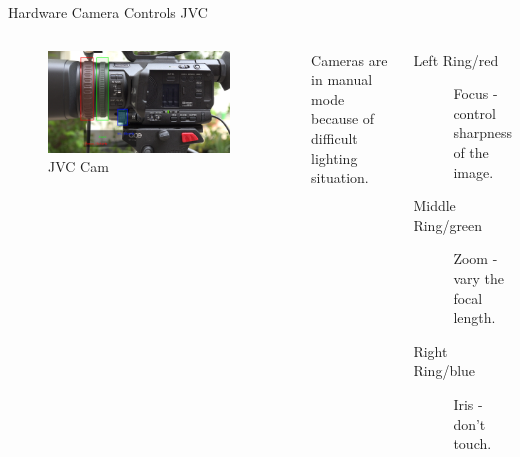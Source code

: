 \documentclass[aspectratio=169]{beamer}
\begin{document}
\begin{frame}{Hardware Camera Controls JVC}
	\begin{columns}[T,onlytextwidth]
	\begin{figure} 
		\centering
		\includegraphics[width=0.9\textwidth]{images/jvc_seitenansicht_objektiv.png}
		\caption{JVC Cam}
	\end{figure}
		Cameras are in manual mode because of difficult lighting situation.
		\begin{description}
			\item[Left Ring/red] Focus - control sharpness of the image.
			\item[Middle Ring/green] Zoom - vary the focal length.
			\item[Right Ring/blue] Iris - don't touch.
		\end{description}
	\end{columns}
\end{frame}

\end{document}
